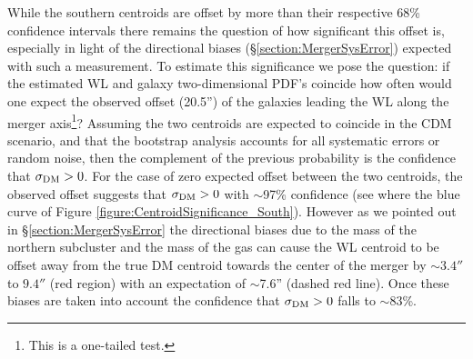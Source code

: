 While the southern centroids are offset by more than their respective 68\% confidence intervals there remains the question of how significant this offset is, especially in light of the directional biases (\S\ref{section:MergerSysError}) expected with such a measurement.
To estimate this significance we pose the question:
if the estimated WL and galaxy two-dimensional PDF's coincide how often would one expect the observed offset (20.5'') of the galaxies leading the WL along the merger axis\footnote{This is a one-tailed test.}?
Assuming the two centroids are expected to coincide in the CDM scenario, and that the bootstrap analysis accounts for all systematic errors or random noise, then the complement of the previous probability is the confidence that $\sigma_{\rm DM}>0$.
For the case of zero expected offset between the two centroids, the observed offset suggests that $\sigma_{\rm DM}>0$ with $\sim$97\% confidence (see where the blue curve of Figure \ref{figure:CentroidSignificance_South}).
However as we pointed out in \S\ref{section:MergerSysError} the directional biases due to the mass of the northern subcluster and the mass of the gas can cause the WL centroid to be offset away from the true DM centroid towards the center of the merger by $\sim3.4''$ to $9.4''$ (red region) with an expectation of $\sim$7.6'' (dashed red line).
Once these biases are taken into account the confidence that $\sigma_{\rm DM}>0$ falls to $\sim$83\%.

